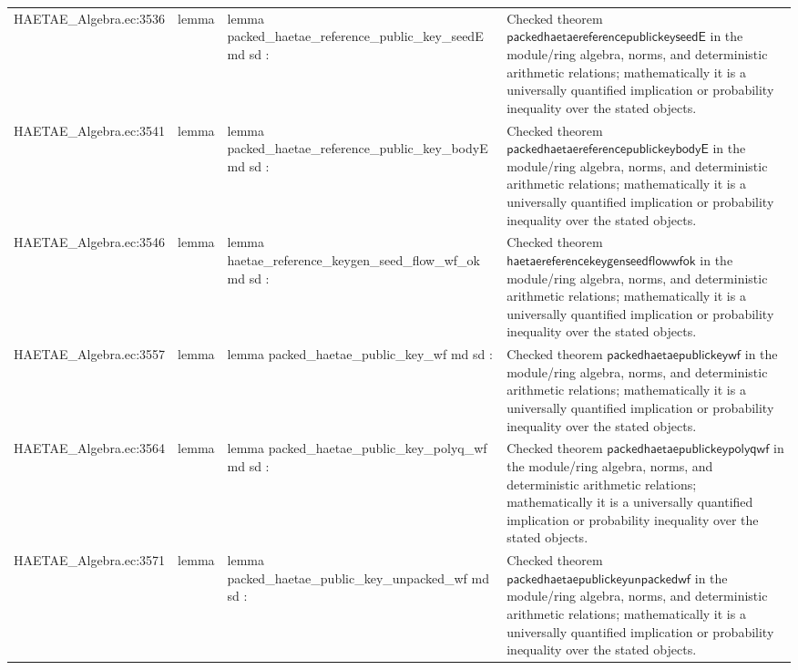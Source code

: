\documentclass[10pt]{article}
\begin{document}
\begin{longtable}{L{0.11\textwidth}L{0.055\textwidth}L{0.385\textwidth}L{0.41\textwidth}}
HAETAE\_\allowbreak{}Algebra.\allowbreak{}ec:\allowbreak{}3536 & lemma & {\ttfamily\scriptsize lemma packed\_\allowbreak{}haetae\_\allowbreak{}reference\_\allowbreak{}public\_\allowbreak{}key\_\allowbreak{}seedE md sd :} & Checked theorem $\mathsf{packedhaetaereferencepublickeyseedE}$ in the module/ring algebra, norms, and deterministic arithmetic relations; mathematically it is a universally quantified implication or probability inequality over the stated objects. \\
HAETAE\_\allowbreak{}Algebra.\allowbreak{}ec:\allowbreak{}3541 & lemma & {\ttfamily\scriptsize lemma packed\_\allowbreak{}haetae\_\allowbreak{}reference\_\allowbreak{}public\_\allowbreak{}key\_\allowbreak{}bodyE md sd :} & Checked theorem $\mathsf{packedhaetaereferencepublickeybodyE}$ in the module/ring algebra, norms, and deterministic arithmetic relations; mathematically it is a universally quantified implication or probability inequality over the stated objects. \\
HAETAE\_\allowbreak{}Algebra.\allowbreak{}ec:\allowbreak{}3546 & lemma & {\ttfamily\scriptsize lemma haetae\_\allowbreak{}reference\_\allowbreak{}keygen\_\allowbreak{}seed\_\allowbreak{}flow\_\allowbreak{}wf\_\allowbreak{}ok md sd :} & Checked theorem $\mathsf{haetaereferencekeygenseedflowwfok}$ in the module/ring algebra, norms, and deterministic arithmetic relations; mathematically it is a universally quantified implication or probability inequality over the stated objects. \\
HAETAE\_\allowbreak{}Algebra.\allowbreak{}ec:\allowbreak{}3557 & lemma & {\ttfamily\scriptsize lemma packed\_\allowbreak{}haetae\_\allowbreak{}public\_\allowbreak{}key\_\allowbreak{}wf md sd :} & Checked theorem $\mathsf{packedhaetaepublickeywf}$ in the module/ring algebra, norms, and deterministic arithmetic relations; mathematically it is a universally quantified implication or probability inequality over the stated objects. \\
HAETAE\_\allowbreak{}Algebra.\allowbreak{}ec:\allowbreak{}3564 & lemma & {\ttfamily\scriptsize lemma packed\_\allowbreak{}haetae\_\allowbreak{}public\_\allowbreak{}key\_\allowbreak{}polyq\_\allowbreak{}wf md sd :} & Checked theorem $\mathsf{packedhaetaepublickeypolyqwf}$ in the module/ring algebra, norms, and deterministic arithmetic relations; mathematically it is a universally quantified implication or probability inequality over the stated objects. \\
HAETAE\_\allowbreak{}Algebra.\allowbreak{}ec:\allowbreak{}3571 & lemma & {\ttfamily\scriptsize lemma packed\_\allowbreak{}haetae\_\allowbreak{}public\_\allowbreak{}key\_\allowbreak{}unpacked\_\allowbreak{}wf md sd :} & Checked theorem $\mathsf{packedhaetaepublickeyunpackedwf}$ in the module/ring algebra, norms, and deterministic arithmetic relations; mathematically it is a universally quantified implication or probability inequality over the stated objects. \\

\end{longtable}
\end{document}
